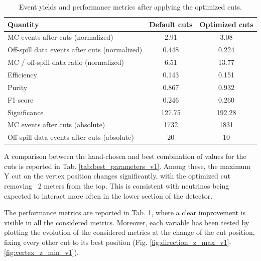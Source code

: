 \begin{table}[htbp]
    \centering
    \begin{tabular}{lcc}
        \hline
        Quantity & Default cuts & Optimized cuts \\
        \hline
        MC events after cuts (normalized)                  & 2.91   & 3.08   \\
        Off-spill data events after cuts (normalized)      & 0.448  & 0.224  \\
        MC / off-spill data ratio (normalized)             & 6.51   & 13.77  \\
        Efficiency                                         & 0.143  & 0.151  \\
        Purity                                             & 0.867  & 0.932  \\
        F1 score                                           & 0.246  & 0.260  \\
        Significance                                       & 127.75 & 192.28 \\
        MC events after cuts (absolute)                    & 1732   & 1831   \\
        Off-spill data events after cuts (absolute)        & 20     & 10     \\
        \hline
    \end{tabular}
    \caption{Event yields and performance metrics after applying the optimized cuts.}
    \label{tab:results_summary_v1}
\end{table}



A comparison between the hand-chosen and best combination of values for the cuts is reported in Tab. \ref{tab:best_parameters_v1}. Among these, the maximum Y cut on the vertex position changes significantly, with the optimized cut removing ~2 meters from the top. This is consistent with neutrinos being expected to interact more often in the lower section of the detector.

The performance metrics are reported in Tab. \ref{tab:results_summary_v1}, where a clear improvement is visible in all the considered metrics. Moreover, each variable has been tested by plotting the evolution of the considered metrics at the change of the cut position, fixing every other cut to its best position (Fig. \ref{fig:direction_z_max_v1}-\ref{fig:vertex_z_min_v1}). 




